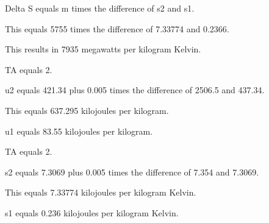 Delta S equals m times the difference of s2 and s1.

This equals 5755 times the difference of 7.33774 and 0.2366.

This results in 7935 megawatts per kilogram Kelvin.

TA equals 2.

u2 equals 421.34 plus 0.005 times the difference of 2506.5 and 437.34.

This equals 637.295 kilojoules per kilogram.

u1 equals 83.55 kilojoules per kilogram.

TA equals 2.

s2 equals 7.3069 plus 0.005 times the difference of 7.354 and 7.3069.

This equals 7.33774 kilojoules per kilogram Kelvin.

s1 equals 0.236 kilojoules per kilogram Kelvin.